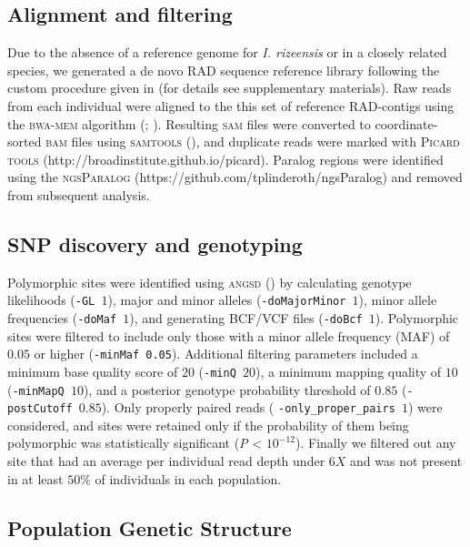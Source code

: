 \documentclass[9pt,a4paper,twoside]{rho-class/rho}
\begin{document}
    \subsection{Alignment and filtering}

        Due to the absence of a reference genome for \textit{I. rizeensis} or in a closely related species, we generated a de novo RAD sequence reference library following the custom procedure given in \cite{SağlamMolEcol2016} (for details see supplementary materials). Raw reads from each individual were aligned to the this set of reference RAD-contigs using the \textsc{bwa-mem} algorithm (\cite{Li2010}; \cite{Li2013}). Resulting \textsc{sam} files were converted to coordinate-sorted \textsc{bam} files using \textsc{samtools} (\cite{Danecek2021}), and duplicate reads were marked with \textsc{Picard tools} (http://broadinstitute.github.io/picard). Paralog regions were identified using the \textsc{ngsParalog} (https://github.com/tplinderoth/ngsParalog) and removed from subsequent analysis.

    \subsection{SNP discovery and genotyping}

        Polymorphic sites were identified using \textsc{angsd}  (\cite{Korneliussen2014}) by calculating genotype likelihoods (\texttt{-GL $1$}), major and minor alleles (\texttt{-doMajorMinor $1$}), minor allele frequencies (\texttt{-doMaf $1$}), and generating \textsc{BCF/VCF} files (\texttt{-doBcf $1$}). Polymorphic sites were filtered to include only those with a minor allele frequency (MAF) of $0.05$ or higher (\texttt{-minMaf 0.05}). Additional filtering parameters included a minimum base quality score of $20$ (\texttt{-minQ $20$}), a minimum mapping quality of $10$ (\texttt{-minMapQ $10$}), and a posterior genotype probability threshold of $0.85$ (\texttt{-postCutoff $0.85$}). Only properly paired reads ( \texttt{-only\_proper\_pairs $1$}) were considered, and sites were retained only if the probability of them being polymorphic was statistically significant (\textit{P} < $10^{-12}$). Finally we filtered out any site that had an average per individual read depth under $6X$ and was not present in at least $50\%$ of individuals in each population.

    \subsection{Population Genetic Structure}
\end{document}
